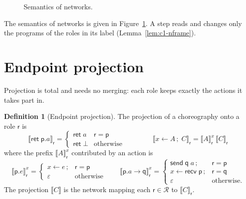 \documentclass[11pt]{report}
\makeatletter
\theoremstyle{plain}
\theoremstyle{definition}
\newtheorem{definition}[theorem]{Definition}
\theoremstyle{remark}
\newcommand{\kw}[1]{\mathsf{#1}}
\newcommand{\pp}{\mathsf{p}}
\newcommand{\qq}{\mathsf{q}}
\newcommand{\rr}{\mathsf{r}}
\newcommand{\Roles}{\mathcal{R}}
\newcommand{\bind}[3]{#1 \leftarrow #2\,;\;#3}
\newcommand{\cret}[1]{\kw{ret}\;#1}
\newcommand{\com}[3]{#1.#2 \to #3}
\newcommand{\tauat}[1]{\tau\mathord{@}#1}
\newcommand{\lto}[1]{\xrightarrow{\;#1\;}}
\newcommand{\nsend}[2]{\kw{send}\;#1\;#2}
\newcommand{\nrecv}[1]{\kw{recv}\;#1}
\newcommand{\upd}[3]{#1[#2 \mapsto #3]}
\newcommand{\proj}[2]{\llbracket #1 \rrbracket_{#2}}
\newcommand{\projn}[1]{\llbracket #1 \rrbracket}
\newcommand{\pre}[3]{\llbracket #1 \rrbracket^{#2}_{#3}}
\newcommand{\rn}[1]{{\normalfont\scshape #1}}
\makeatother
\begin{document}
\begin{figure}[t]
\caption{Semantics of networks.}
\label{fig:c1-net}
\end{figure}

The semantics of networks is given in Figure~\ref{fig:c1-net}.  A step reads
and changes only the programs of the roles in its label
(Lemma~\ref{lem:c1-nframe}).

\section{Endpoint projection}
\label{sec:c1-epp}

Projection is total and needs no merging: each role keeps exactly the actions
it takes part in.

\begin{definition}[Endpoint projection]\label{def:c1-epp}
  The projection of a choreography onto a role $\rr$ is
  \[
  \proj{\cret{\pp.a}}{\rr} =
    \begin{cases}
      \kw{ret}\;a & \rr = \pp\\
      \kw{ret}\;\bot & \text{otherwise}
    \end{cases}
  \qquad\qquad
  \proj{\bind{x}{A}{C}}{\rr} = \pre{A}{x}{\rr}\,\proj{C}{\rr}
  \]
  where the prefix $\pre{A}{x}{\rr}$ contributed by an action is
  \[
  \pre{\pp.e}{x}{\rr} =
    \begin{cases}
      x\leftarrow e\,; & \rr=\pp\\
      \varepsilon & \text{otherwise}
    \end{cases}
  \qquad
  \pre{\com{\pp}{a}{\qq}}{x}{\rr} =
    \begin{cases}
      \nsend{\qq}{a}\,; & \rr=\pp\\
      x\leftarrow\nrecv{\pp}\,; & \rr=\qq\\
      \varepsilon & \text{otherwise.}
    \end{cases}
  \]
  The projection $\projn{C}$ is the network mapping each $\rr\in\Roles$ to
  $\proj{C}{\rr}$.
\end{definition}
\end{document}
